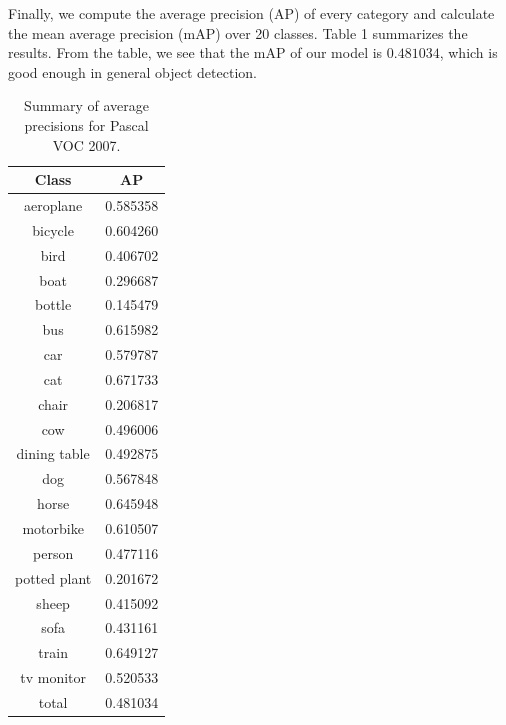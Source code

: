 \documentclass[10pt]{article}
\begin{document}
	\newpage Finally, we compute the average precision (AP) of every category and calculate the mean average precision (mAP) over 20 classes. Table 1 summarizes the results. From the table, we see that the mAP of our model is $0.481034$, which is good enough in general object detection.\\
	\begin{table}[ht]
 		\centering
 		\begin{tabular}{|c|c|}
		\hline
		Class & AP \\ \hline
		aeroplane & 0.585358  \\ \hline
		bicycle & 0.604260 \\ \hline
		bird & 0.406702  \\ \hline
		boat & 0.296687 \\ \hline
		bottle & 0.145479  \\ \hline
		bus & 0.615982 \\ \hline
		car & 0.579787  \\ \hline
		cat & 0.671733 \\ \hline
		chair & 0.206817 \\ \hline
		cow & 0.496006 \\ \hline
		dining table & 0.492875  \\ \hline
		dog & 0.567848 \\ \hline
		horse & 0.645948  \\ \hline
		motorbike & 0.610507 \\ \hline
		person & 0.477116  \\ \hline
		potted plant& 0.201672 \\ \hline
		sheep & 0.415092  \\ \hline
		sofa & 0.431161 \\ \hline
		train & 0.649127  \\ \hline
		tv monitor & 0.520533 \\ \hline
		total & 0.481034 \\ \hline
 		\end{tabular}
		\caption{Summary of average precisions for Pascal VOC 2007.}\label{tab1}
	\end{table}\\
\end{document}
